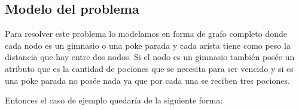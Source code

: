 

\subsection{Modelo del problema}

Para resolver este problema lo modelamos en forma de grafo completo donde cada nodo es un gimnasio o una poke parada y cada arista tiene como peso la distancia que hay entre dos nodos. Si el nodo es un gimnasio también posée un atributo que es la cantidad de pociones que se necesita para ser vencido y si es una poke parada no posée nada ya que por cada una se reciben tres pociones.

Entonces el caso de ejemplo quedaría de la siguiente forma:

